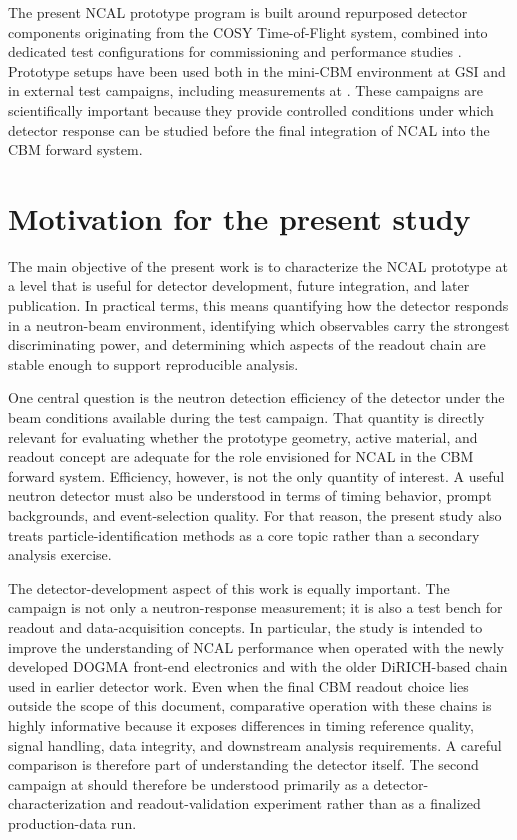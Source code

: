 The present NCAL prototype program is built around repurposed detector components originating from the COSY Time-of-Flight system, combined into dedicated test configurations for commissioning and performance studies \citep{Okropiridze2024SimulationNCAL,Okropiridze2026NCALAddendum}. Prototype setups have been used both in the mini-CBM environment at GSI and in external test campaigns, including measurements at \NCALInstitute \citep{Okropiridze2026NCALAddendum}. These campaigns are scientifically important because they provide controlled conditions under which detector response can be studied before the final integration of NCAL into the CBM forward system.

\section{Motivation for the present study}

The main objective of the present work is to characterize the NCAL prototype at a level that is useful for detector development, future integration, and later publication. In practical terms, this means quantifying how the detector responds in a neutron-beam environment, identifying which observables carry the strongest discriminating power, and determining which aspects of the readout chain are stable enough to support reproducible analysis.

One central question is the neutron detection efficiency of the detector under the beam conditions available during the test campaign. That quantity is directly relevant for evaluating whether the prototype geometry, active material, and readout concept are adequate for the role envisioned for NCAL in the CBM forward system. Efficiency, however, is not the only quantity of interest. A useful neutron detector must also be understood in terms of timing behavior, prompt backgrounds, and event-selection quality. For that reason, the present study also treats particle-identification methods as a core topic rather than a secondary analysis exercise.

The detector-development aspect of this work is equally important. The campaign is not only a neutron-response measurement; it is also a test bench for readout and data-acquisition concepts. In particular, the study is intended to improve the understanding of NCAL performance when operated with the newly developed DOGMA front-end electronics and with the older DiRICH-based chain used in earlier detector work. Even when the final CBM readout choice lies outside the scope of this document, comparative operation with these chains is highly informative because it exposes differences in timing reference quality, signal handling, data integrity, and downstream analysis requirements. A careful comparison is therefore part of understanding the detector itself. The second campaign at \NCALInstitute should therefore be understood primarily as a detector-characterization and readout-validation experiment rather than as a finalized production-data run.

